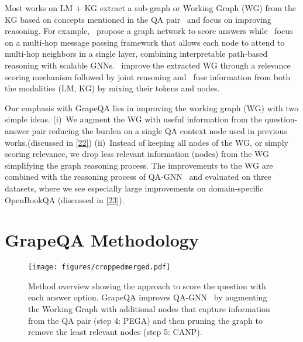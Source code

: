 \documentclass[11pt]{article}
\begin{document}
Most works on LM + KG extract a sub-graph or Working Graph (WG) from the KG based on concepts mentioned in the QA pair~\cite{lin-etal-2019-kagnet,feng-etal-2020-scalable,yasunaga-etal-2021-qa} and focus on improving reasoning.
For example, \citet{lin-etal-2019-kagnet}~propose a graph network to score answers while~\citet{feng-etal-2020-scalable} focus on a multi-hop message passing framework that allows each node to attend to multi-hop neighbors in a single layer, combining interpretable path-based reasoning with scalable GNNs.
\citet{yasunaga-etal-2021-qa}~improve the extracted WG through a relevance scoring mechanism followed by joint reasoning and~\citet{zhang2022greaselm} fuse information from both the modalities (LM, KG) by mixing their tokens and nodes.














Our emphasis with GrapeQA lies in improving the working graph (WG) with two simple ideas.
(i)~We augment the WG with useful information from the question-answer pair reducing the burden on a single QA context node used in previous works.(discussed in \ref{22})
(ii)~Instead of keeping all nodes of the WG, or simply scoring relevance, we drop less relevant information (nodes) from the WG simplifying the graph reasoning process.
The improvements to the WG are combined with the reasoning process of QA-GNN~\cite{yasunaga-etal-2021-qa} and evaluated on three datasets, where we see especially large improvements on domain-specific OpenBookQA (discussed in \ref{23}).









\section{GrapeQA Methodology}

\begin{figure*}[t!]
\centering \texttt{[image: figures/croppedmerged.pdf]}
\vspace{-3mm}
\caption{Method overview showing the approach to score the question with each answer option.
GrapeQA improves QA-GNN~\cite{yasunaga-etal-2021-qa} by augmenting the Working Graph with additional nodes that capture information from the QA pair (step 4: PEGA) and then pruning the graph to remove the least relevant nodes (step 5: CANP).}
\label{fig:model_overview}
\end{figure*}
\end{document}
